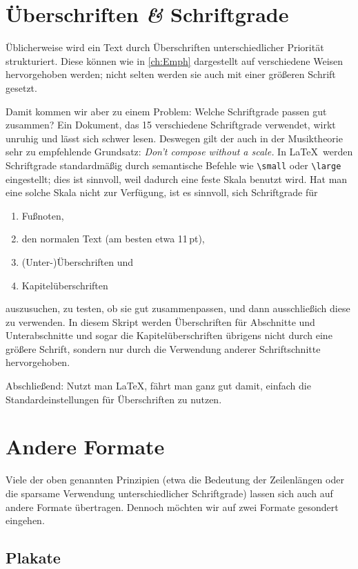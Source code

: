 \section{Überschriften \emph{\&} Schriftgrade}

Üblicherweise wird ein Text durch Überschriften unterschiedlicher Priorität
strukturiert. Diese können wie in \cref{ch:Emph} dargestellt auf verschiedene
Weisen hervorgehoben werden; nicht selten werden sie auch mit einer größeren
Schrift gesetzt.

Damit kommen wir aber zu einem Problem: Welche Schriftgrade passen gut
zusammen? Ein Dokument, das 15 verschiedene Schriftgrade verwendet, wirkt
unruhig und lässt sich schwer lesen. Deswegen gilt der auch in der Musiktheorie
sehr zu empfehlende Grundsatz: \emph{Don’t compose without a scale.} In \LaTeX\
werden Schriftgrade standardmäßig durch semantische Befehle wie \verb!\small!
oder \verb!\large! eingestellt; dies ist sinnvoll, weil dadurch eine feste Skala
benutzt wird. Hat man eine solche Skala nicht zur Verfügung, ist es sinnvoll,
sich Schriftgrade für
\begin{enumerate}[nosep]
\item Fußnoten,
\item den normalen Text (am besten etwa 11\,pt),
\item (Unter-)Überschriften und
\item Kapitelüberschriften
\end{enumerate}
auszusuchen, zu testen, ob sie gut zusammenpassen, und dann ausschließich diese
zu verwenden. In diesem Skript werden Überschriften für Abschnitte und
Unterabschnitte und sogar die Kapitelüberschriften übrigens nicht durch eine
größere Schrift, sondern nur durch die Verwendung anderer Schriftschnitte
hervorgehoben.

Abschließend: Nutzt man \LaTeX, fährt man ganz gut damit, einfach die
Standardeinstellungen für Überschriften zu nutzen.

\section{Andere Formate}

Viele der oben genannten Prinzipien (etwa die Bedeutung der Zeilenlängen
oder die sparsame Verwendung unterschiedlicher Schriftgrade) lassen sich auch
auf andere Formate übertragen. Dennoch möchten wir auf zwei Formate gesondert
eingehen.

\subsection{Plakate}

